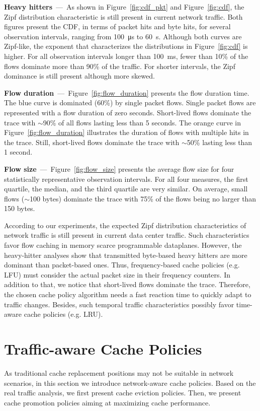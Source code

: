 \textbf{Heavy hitters}~---~As shown in Figure~\ref{fig:cdf_pkt} and Figure~\ref{fig:cdf}, the Zipf distribution characteristic is still present in current network traffic.
Both figures present the CDF, in terms of packet hits and byte hits, for several observation intervals, ranging from \SI{100}{\micro\second} to \SI{60}{\second}.
Although both curves are Zipf-like, the exponent that characterizes the distributions in Figure~\ref{fig:cdf} is higher.
For all observation intervals longer than \SI{100}{\milli\second}, fewer than 10\% of the flows dominate more than 90\% of the traffic.
For shorter intervals, the Zipf dominance is still present although more skewed.

\textbf{Flow duration}~---~Figure~\ref{fig:flow_duration} presents the flow duration time.
The blue curve is dominated (60\%) by single packet flows.
Single packet flows are represented with a flow duration of zero seconds.
Short-lived flows dominate the trace with $\sim$90\% of all flows lasting less than 5 seconds.
The orange curve in Figure~\ref{fig:flow_duration} illustrates the duration of flows with multiple hits in the trace.
Still, short-lived flows dominate the trace with $\sim$50\% lasting less than 1 second.%

\textbf{Flow size}~---~Figure~\ref{fig:flow_size} presents the average flow size for four statistically representative observation intervals.
For all four measures, the first quartile, the median, and the third quartile are very similar.
On average, small flows ($\sim$100 bytes) dominate the trace with 75\% of the flows being no larger than 150 bytes.

According to our experiments, the expected Zipf distribution characteristics of network traffic is still present in current data center traffic.
Such characteristics favor flow caching in memory scarce programmable dataplanes.
However, the heavy-hitter analyses show that transmitted byte-based heavy hitters are more dominant than packet-based ones.
Thus, frequency-based cache policies (e.g. LFU) must consider the actual packet size in their frequency counters.
In addition to that, we notice that short-lived flows dominate the trace.
Therefore, the chosen cache policy algorithm needs a fast reaction time to quickly adapt to traffic changes.
Besides, such temporal traffic characteristics possibly favor time-aware cache policies (e.g. LRU).

\section{Traffic-aware Cache Policies}\label{sec:policies}
As traditional cache replacement positions may not be suitable in network scenarios, in this section we introduce network-aware cache policies.
Based on the real traffic analysis, we first present cache eviction policies.
Then, we present cache promotion policies aiming at maximizing cache performance.

